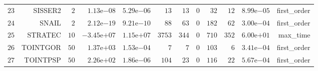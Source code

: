 \begin{longtable}{rrrrrrrrrrrr}
  \(    23\) & SISSER2 & \(     2\) & \( 1.13\)e\(-08\) & \( 5.29\)e\(-06\) & \(    13\) & \(    13\) & \(     0\) & \(    32\) & \(    12\) & \( 8.99\)e\(-05\) & first\_order \\
  \(    24\) & SNAIL & \(     2\) & \( 2.12\)e\(-19\) & \( 9.21\)e\(-10\) & \(    88\) & \(    63\) & \(     0\) & \(   182\) & \(    62\) & \( 3.00\)e\(-04\) & first\_order \\
  \(    25\) & STRATEC & \(    10\) & \(-3.45\)e\(+07\) & \( 1.15\)e\(+07\) & \(  3753\) & \(   344\) & \(     0\) & \(   710\) & \(   352\) & \( 6.00\)e\(+01\) & max\_time \\
  \(    26\) & TOINTGOR & \(    50\) & \( 1.37\)e\(+03\) & \( 1.53\)e\(-04\) & \(     7\) & \(     7\) & \(     0\) & \(   103\) & \(     6\) & \( 3.41\)e\(-04\) & first\_order \\
  \(    27\) & TOINTPSP & \(    50\) & \( 2.26\)e\(+02\) & \( 1.86\)e\(-06\) & \(   104\) & \(    23\) & \(     0\) & \(   116\) & \(    22\) & \( 5.67\)e\(-04\) & first\_order \\\hline
\end{longtable}
